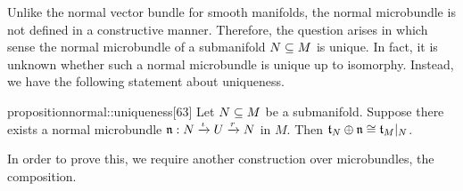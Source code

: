 \begin{myparagraph} Unlike the normal vector bundle for smooth manifolds, the normal microbundle is not defined in a constructive manner. Therefore, the question arises in which sense the normal microbundle of a submanifold $N \subseteq{} M$ is unique. In fact, it is unknown whether such a normal microbundle is unique up to isomorphy. Instead, we have the following statement about uniqueness. \end{myparagraph}

\begin{mystatement}{proposition}{normal::uniqueness}[63] Let $N \subseteq{} M$ be a submanifold. Suppose there exists a normal microbundle $\mathfrak{n}: N \xrightarrow{\iota} U \xrightarrow{r} N{}$ in $M$. Then $\mathfrak{t}_N \oplus \mathfrak{n} \cong \mathfrak{t}_M\vert_{N}$. \end{mystatement}

\begin{myparagraph} In order to prove this, we require another construction over microbundles, the composition. \end{myparagraph} 

